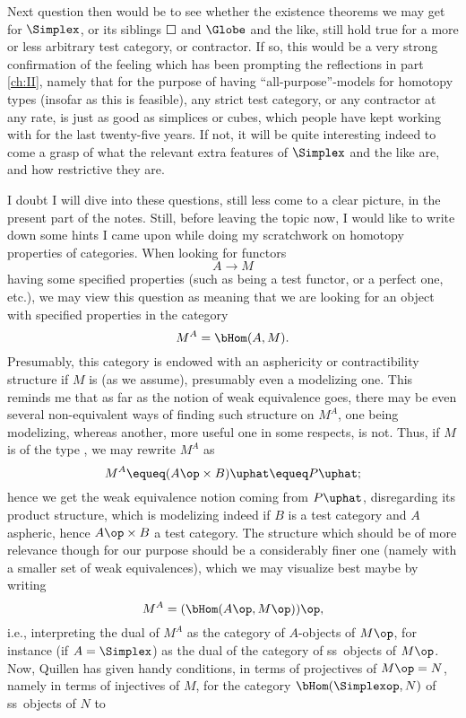 Next question then would be to see whether the existence theorems we
may get for $\Simplex$, or its siblings $\Square$ and $\Globe$ and the
like, still hold true for a more or less arbitrary test category, or
contractor. If so, this would be a very strong confirmation of the
feeling which has been prompting the reflections in part \ref{ch:II},
namely that for the purpose of having ``all-purpose''-models for
homotopy types (insofar as this is feasible), any strict test
category, or any contractor at any rate, is just as good as simplices
or cubes, which people have kept working with for the last twenty-five
years. If not, it will be quite interesting indeed to come a grasp of
what the relevant extra features of $\Simplex$ and the like are, and
how restrictive they are.

I doubt I will dive into these questions, still less come to a clear
picture, in the present part of the notes. Still, before leaving the
topic now, I would like to write down some hints I came upon while
doing my scratchwork on homotopy properties of \Ahat{}
categories. When looking for functors
\[A\to M\]
having some specified properties (such as being a test functor, or a
perfect one, etc.), we may view this question as meaning that we are
looking for an object with specified properties in the category
\[M^A =\bHom(A,M).\]
Presumably, this category is endowed with an asphericity or
contractibility structure if $M$ is (as we assume), presumably even a
modelizing one. This reminds me that as far as the notion of weak
equivalence goes, there may be even several non-equivalent ways of
finding such structure on $M^A$, one being modelizing, whereas
another, more useful one in some respects, is not. Thus, if $M$ is of
the type \Bhat, we may rewrite $M^A$ as
\[ M^A \equeq (A\op\times B)\uphat \equeq P\uphat;\]
hence we get the weak equivalence notion coming from $P\uphat$,
disregarding its product structure, which is modelizing indeed if $B$
is a test category and $A$ aspheric, hence $A\op\times B$ a test
category. The structure which should be of more relevance though for
our purpose should be a considerably finer one (namely with a smaller
set of weak equivalences), which we may visualize best
maybe by writing
\[M^A=(\bHom(A\op,M\op))\op,\]
i.e., interpreting the dual of $M^A$ as the category of $A$-objects of
$M\op$, for instance (if $A=\Simplex$) as the dual of the category of
ss~objects of $M\op$. Now, Quillen has given handy conditions, in
terms of projectives of $M\op=N$, namely in terms of injectives of
$M$, for the category $\bHom(\Simplexop,N)$ of ss~objects of $N$ to
